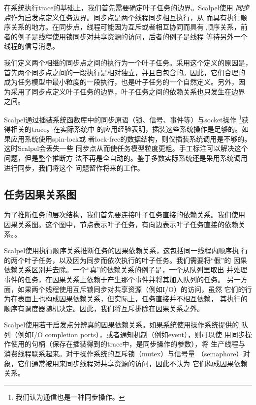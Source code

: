 在系统执行trace的基础上，我们首先需要确定叶子任务的边界。Scalpel使用
\emph{同步点}作为启发点定义任务边界。同步点是两个线程同步相互执行，从
而具有执行顺序关系的地方。在同步点，线程可能因为互斥或者相互协同而具有
顺序关系，前者的例子是线程使用锁同步对共享资源的访问，后者的例子是线程
等待另外一个线程的信号消息。

我们定义两个相继的同步点之间的执行为一个叶子任务。采用这个定义的原因是，
首先两个同步点之间的一段执行是相对独立，并且自包含的。因此，它们合理的
成为任务模型中最小粒度的一段执行，也是叶子任务的一个自然定义。另外，因
为采用了同步点定义叶子任务的边界，叶子任务之间的依赖关系也只发生在边界
之间。

Scalpel通过插装系统函数库中的同步原语（锁、信号、事件等）与socket操作
\footnote{我们认为通信也是一种同步操作。}获得相关的trace。在实际系统中
的应用经验表明，插装这些系统操作是足够的。如果应用系统使用spin-lock或
者lock-free的数据结构，则仅插装系统调用是不够的。这时Scalpel会丢失一些
同步点从而使任务模型粒度更粗。手工标注可以解决这个问题，但是整个推断方
法不再是全自动的。鉴于多数实际系统还是采用系统调用进行同步，我们将这个
问题留作将来的工作。

\subsection{任务因果关系图}

为了推断任务的层次结构，我们首先要连接叶子任务直接的依赖关系。我们使用
因果关系图。这个图中，节点表示叶子任务，有向边表示叶子任务直接的依赖关
系。。

Scalpel使用执行顺序关系推断任务的因果依赖关系，这包括同一线程内顺序执
行的两个叶子任务，以及因为同步而依次执行的叶子任务。我们需要将“假”的
因果依赖关系区别并去除。一个“真”的依赖关系的例子是，一个从队列里取出
并处理事件的任务，在因果关系上依赖于产生那个事件并将其加入队列的任务。
另一方面，如果两个线程使用互斥锁同步对共享资源（例如I/O）的访问，虽然
它们的行为在表面上也构成因果依赖关系，但实际上，任务直接并不相互依赖，
其执行的顺序有调度器随机决定。因此，我们将互斥排除在因果关系之外。

Scalpel使用若干启发点分辨真的因果依赖关系。如果系统使用操作系统提供的
队列（例如I/O completion ports），或者通知机制（例如event），则可以使
用同步操作使用的句柄（保存在插装得到的trace中，是同步操作的参数），将
生产线程与消费线程联系起来。对于操作系统的互斥锁（mutex）与信号量
（semaphore）对象，它们通常被用来同步线程对共享资源的访问，因此不认为
它们构成因果依赖关系。


